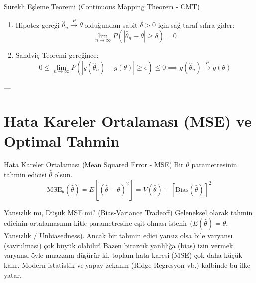 \documentclass[12pt,a4paper]{article}
\begin{document}
\begin{odev}{Sürekli Eşleme Teoremi (Continuous Mapping Theorem - CMT)}
\begin{enumerate}
\begin{equation}
        P\left( |g(\hat{\theta}_n) - g(\theta)| \ge \epsilon \right) \le P\left( |\hat{\theta}_n - \theta| \ge \delta \right)
    \end{equation}
    \item Hipotez gereği $\hat{\theta}_n \xrightarrow{P} \theta$ olduğundan sabit $\delta > 0$ için sağ taraf sıfıra gider:
    \begin{equation}
        \lim_{n \to \infty} P\left( |\hat{\theta}_n - \theta| \ge \delta \right) = 0
    \end{equation}
    \item Sandviç Teoremi gereğince:
    \begin{equation}
        0 \le \lim_{n \to \infty} P\left( |g(\hat{\theta}_n) - g(\theta)| \ge \epsilon \right) \le 0 \implies \boxed{g(\hat{\theta}_n) \xrightarrow{P} g(\theta)}
    \end{equation}
\end{enumerate}
\end{odev}

---

\section{Hata Kareler Ortalaması (MSE) ve Optimal Tahmin}

\begin{tanim}{Hata Kareler Ortalaması (Mean Squared Error - MSE)}
Bir $\theta$ parametresinin tahmin edicisi $\hat{\theta}$ olsun.
\begin{equation}
    \boxed{\text{MSE}_\theta(\hat{\theta}) = E\left[ (\hat{\theta} - \theta)^2 \right] = V(\hat{\theta}) + \left[ \text{Bias}(\hat{\theta}) \right]^2}
\end{equation}
\end{tanim}

\begin{sezgi}{Yansızlık mı, Düşük MSE mi? (Bias-Variance Tradeoff)}
Geleneksel olarak tahmin edicinin ortalamasının kitle parametresine eşit olması istenir ($E(\hat{\theta})=\theta$, Yansızlık / Unbiasedness).  
Ancak bir tahmin edici yansız olsa bile varyansı (savrulması) çok büyük olabilir!  
Bazen birazcık yanlılığa (bias) izin vermek varyansı öyle muazzam düşürür ki, toplam hata karesi (MSE) çok daha küçük kalır. Modern istatistik ve yapay zekanın (Ridge Regresyon vb.) kalbinde bu ilke yatar.
\end{sezgi}
\end{document}
